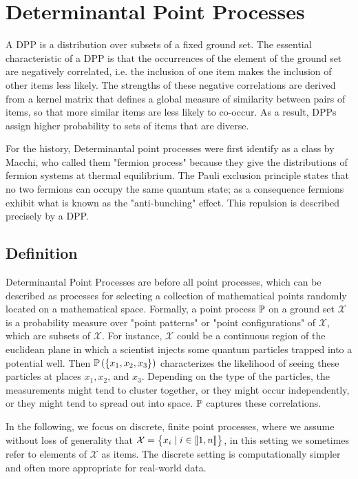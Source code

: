 \section{Determinantal Point Processes}

A DPP is a distribution over subsets of a fixed ground set.  The essential characteristic of a DPP is that the occurrences of the element of the ground set are negatively correlated, i.e. the inclusion of one item
makes the inclusion of other items less likely. The strengths of these negative correlations are derived from a kernel matrix that defines a global measure of similarity between pairs of items, so that more similar items are less likely to co-occur. As a result, DPPs assign higher probability to sets of items that are diverse.


For the history, Determinantal point processes were first identify as a class by Macchi, who called them "fermion process" because they give the distributions of fermion systems at thermal equilibrium. The Pauli exclusion principle states that no two fermions can occupy the same quantum state; as a consequence fermions exhibit what is known as the
"anti-bunching" effect. This repulsion is described precisely by a DPP.

\subsection{Definition}
Determinantal Point Processes are before all point processes, which can be described as processes for selecting a collection of mathematical points randomly located on a mathematical space. Formally, a point process $\mathbb{P}$ on a ground set $\mathcal{X}$ is a probability measure over "point patterns" or "point configurations" of $\mathcal{X}$, which are subsets of $\mathcal{X}$. For instance, $\mathcal{X}$ could be a continuous region of the euclidean plane in which a scientist injects some quantum particles trapped into a potential well. Then $\mathbb{P}\left(\left\{x_1, x_2, x_3\right\}\right)$ characterizes the likelihood of seeing these particles at places $x_1, x_2$, and $x_3$. Depending on the type of the particles, the measurements might tend to cluster together, or they might occur independently, or they might tend to spread out into space. $\mathbb{P}$ captures these correlations.

In the following, we focus on discrete, finite point processes, where we assume without loss of generality that $\mathcal{X}=\begin{Bmatrix}
    x_{i} \mid i\in \llbracket 1,n \rrbracket
    \end{Bmatrix}$, in this setting we sometimes refer to elements of $\mathcal{X}$ as items. The discrete setting is computationally simpler and often more appropriate for real-world data.

